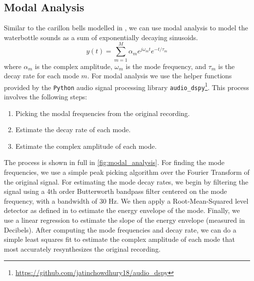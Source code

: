 \documentclass[twoside,a4paper]{article}
\begin{document}
\subsection{Modal Analysis} \label{sec:modal-analysis}
%
Similar to the carillon bells modelled in \cite{canfielddafilou:werner:bellEffects:2017,rau:das:canfielddafilou:carillon:2019},
we can use modal analysis to model the waterbottle sounds as
a sum of exponentially decaying sinusoids.
\begin{equation}
    y(t) = \sum_{m=1}^M \alpha_m e^{j\omega_m t} e^{-t/\tau_m}
    \label{eq:modal-def}
\end{equation}
%
where $\alpha_m$ is the complex amplitude, $\omega_m$ is the mode
frequency, and $\tau_m$ is the decay rate for each mode $m$.
\newline\newline
For modal analysis we use the helper functions
provided by the \texttt{Python} audio signal processing library
\texttt{audio\_dspy}\footnote{\url{https://github.com/jatinchowdhury18/audio_dspy}}.
This process involves the following steps:
\begin{enumerate}
    \item Picking the modal frequencies from the original recording.
    \item Estimate the decay rate of each mode.
    \item Estimate the complex amplitude of each mode.
\end{enumerate}
%
The process is shown in  full in \cref{fig:modal_analysis}.
\newline\newline
For finding the mode frequencies, we use a simple peak picking
algorithm over the Fourier Transform of the original signal.
\newline\newline
For estimating the mode decay rates, we begin by filtering
the signal using a 4th order Butterworth bandpass filter
centered on the mode frequency, with a bandwidth of 30 Hz.
We then apply a Root-Mean-Squared level detector as defined
in \cite{giannoulis2012compressor} to estimate the energy
envelope of the mode. Finally, we use a linear regression
to estimate the slope of the energy envelope (measured in
Decibels).
\newline\newline
After computing the mode frequencies and decay
rate, we can do a simple least squares fit to
estimate the complex amplitude of each mode that
most accurately resynthesizes the original recording.
\end{document}
